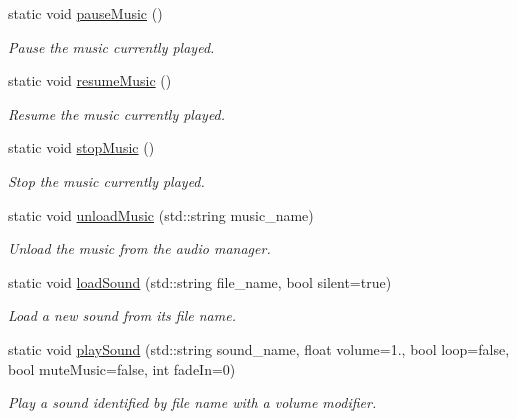 \begin{DoxyCompactItemize}
\mbox{\label{class_audio_manager_a8afd8f3db6787f87aa55436d6c9dadf1}} 
static void \hyperlink{class_audio_manager_a8afd8f3db6787f87aa55436d6c9dadf1}{pause\+Music} ()
\begin{DoxyCompactList}\small\item\em Pause the music currently played. \end{DoxyCompactList}\item 
\mbox{\label{class_audio_manager_a213a73d801ac409765010ba6d7a8f4f3}} 
static void \hyperlink{class_audio_manager_a213a73d801ac409765010ba6d7a8f4f3}{resume\+Music} ()
\begin{DoxyCompactList}\small\item\em Resume the music currently played. \end{DoxyCompactList}\item 
\mbox{\label{class_audio_manager_a72a288a0d8397bed1a9a39efca363326}} 
static void \hyperlink{class_audio_manager_a72a288a0d8397bed1a9a39efca363326}{stop\+Music} ()
\begin{DoxyCompactList}\small\item\em Stop the music currently played. \end{DoxyCompactList}\item 
static void \hyperlink{class_audio_manager_a6abc50fbd069dae8b38bb8d8aa9476cd}{unload\+Music} (std\+::string music\+\_\+name)
\begin{DoxyCompactList}\small\item\em Unload the music from the audio manager. \end{DoxyCompactList}\item 
static void \hyperlink{class_audio_manager_a6a0b83c130c022c7557bcc4edb7c59d8}{load\+Sound} (std\+::string file\+\_\+name, bool silent=true)
\begin{DoxyCompactList}\small\item\em Load a new sound from its file name. \end{DoxyCompactList}\item 
static void \hyperlink{class_audio_manager_a54e2edf4bdf4702431e7afae0db8955c}{play\+Sound} (std\+::string sound\+\_\+name, float volume=1., bool loop=false, bool mute\+Music=false, int fade\+In=0)
\begin{DoxyCompactList}\small\item\em Play a sound identified by file name with a volume modifier. \end{DoxyCompactList}\item 

\end{DoxyCompactItemize}
